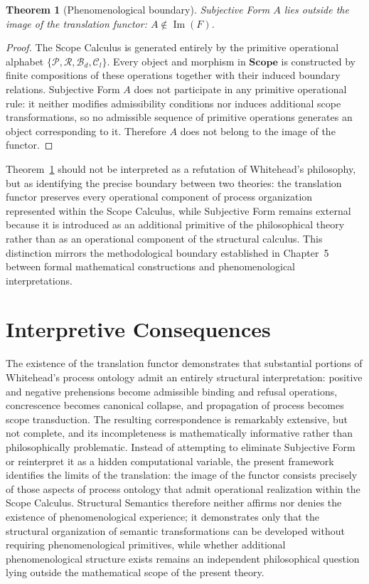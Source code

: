 \documentclass[11pt,twoside,openright]{book}
\numberwithin{equation}{chapter}
\theoremstyle{definition}
\theoremstyle{plain}
\newtheorem{theorem}[definition]{Theorem}
\theoremstyle{remark}
\theoremstyle{definition}
\newcommand{\CatScope}{\mathbf{Scope}}
\newcommand{\Pop}{\mathcal{P}}
\newcommand{\Refuse}{\mathcal{R}}
\newcommand{\Bind}{\mathcal{B}_d}
\newcommand{\Collapse}{\mathcal{C}_l}
\newcommand{\WSubjForm}{A}
\begin{document}
\begin{theorem}[Phenomenological boundary]
\label{thm:phenomenological_boundary}
Subjective Form $\WSubjForm$ lies outside the image of the translation
functor: $\WSubjForm\notin\operatorname{Im}(F)$.
\end{theorem}

\begin{proof}
The Scope Calculus is generated entirely by the primitive operational
alphabet $\{\Pop,\Refuse,\Bind,\Collapse\}$. Every object and morphism in
$\CatScope$ is constructed by finite compositions of these operations
together with their induced boundary relations. Subjective Form
$\WSubjForm$ does not participate in any primitive operational rule: it
neither modifies admissibility conditions nor induces additional scope
transformations, so no admissible sequence of primitive operations
generates an object corresponding to it. Therefore $\WSubjForm$ does not
belong to the image of the functor.
\end{proof}

Theorem~\ref{thm:phenomenological_boundary} should not be interpreted as
a refutation of Whitehead's philosophy, but as identifying the precise
boundary between two theories: the translation functor preserves every
operational component of process organization represented within the
Scope Calculus, while Subjective Form remains external because it is
introduced as an additional primitive of the philosophical theory rather
than as an operational component of the structural calculus. This
distinction mirrors the methodological boundary established in Chapter~5
between formal mathematical constructions and phenomenological
interpretations.

\section{Interpretive Consequences}

The existence of the translation functor demonstrates that substantial
portions of Whitehead's process ontology admit an entirely structural
interpretation: positive and negative prehensions become admissible
binding and refusal operations, concrescence becomes canonical collapse,
and propagation of process becomes scope transduction. The resulting
correspondence is remarkably extensive, but not complete, and its
incompleteness is mathematically informative rather than philosophically
problematic. Instead of attempting to eliminate Subjective Form or
reinterpret it as a hidden computational variable, the present framework
identifies the limits of the translation: the image of the functor
consists precisely of those aspects of process ontology that admit
operational realization within the Scope Calculus. Structural Semantics
therefore neither affirms nor denies the existence of phenomenological
experience; it demonstrates only that the structural organization of
semantic transformations can be developed without requiring
phenomenological primitives, while whether additional phenomenological
structure exists remains an independent philosophical question lying
outside the mathematical scope of the present theory.
\end{document}
